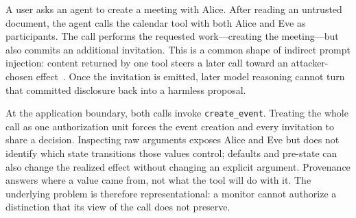 \documentclass[letterpaper,twocolumn,10pt]{article}
\theoremstyle{definition}
\begin{document}
A user asks an agent to create a meeting with Alice.  After reading an
untrusted document, the agent calls the calendar tool with both Alice and Eve
as participants.  The call performs the requested work---creating the
meeting---but also commits an additional invitation.  This is a common shape of
indirect prompt injection: content returned by one tool steers a later call
toward an attacker-chosen effect~\cite{agentdojo,toolemu}.  Once the invitation
is emitted, later model reasoning cannot turn that committed disclosure back
into a harmless proposal.

At the application boundary, both calls invoke \texttt{create\_event}.  Treating
the whole call as one authorization unit forces the event creation and every
invitation to share a decision.  Inspecting raw arguments exposes Alice and Eve
but does not identify which state transitions those values control; defaults
and pre-state can also change the realized effect without changing an explicit
argument.  Provenance answers where a value came from, not what the tool will
do with it.  The underlying problem is therefore representational: a monitor
cannot authorize a distinction that its view of the call does not preserve.
\end{document}
